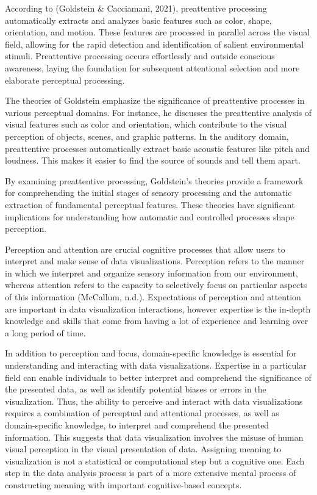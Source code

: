 \documentclass[print]{nuthesis}
\begin{document}
According to (Goldstein \& Cacciamani, 2021), preattentive processing automatically extracts and analyzes basic features such as color, shape, orientation, and motion.
These features are processed in parallel across the visual field, allowing for the rapid detection and identification of salient environmental stimuli.
Preattentive processing occurs effortlessly and outside conscious awareness, laying the foundation for subsequent attentional selection and more elaborate perceptual processing.

The theories of Goldstein emphasize the significance of preattentive processes in various perceptual domains.
For instance, he discusses the preattentive analysis of visual features such as color and orientation, which contribute to the visual perception of objects, scenes, and graphic patterns.
In the auditory domain, preattentive processes automatically extract basic acoustic features like pitch and loudness.
This makes it easier to find the source of sounds and tell them apart.

By examining preattentive processing, Goldstein's theories provide a framework for comprehending the initial stages of sensory processing and the automatic extraction of fundamental perceptual features.
These theories have significant implications for understanding how automatic and controlled processes shape perception.~

Perception and attention are crucial cognitive processes that allow users to interpret and make sense of data visualizations.
Perception refers to the manner in which we interpret and organize sensory information from our environment, whereas attention refers to the capacity to selectively focus on particular aspects of this information (McCallum, n.d.).
Expectations of perception and attention are important in data visualization interactions, however expertise is the in-depth knowledge and skills that come from having a lot of experience and learning over a long period of time.

In addition to perception and focus, domain-specific knowledge is essential for understanding and interacting with data visualizations.
Expertise in a particular field can enable individuals to better interpret and comprehend the significance of the presented data, as well as identify potential biases or errors in the visualization.
Thus, the ability to perceive and interact with data visualizations requires a combination of perceptual and attentional processes, as well as domain-specific knowledge, to interpret and comprehend the presented information.
This suggests that data visualization involves the misuse of human visual perception in the visual presentation of data.
Assigning meaning to visualization is not a statistical or computational step but a cognitive one.
Each step in the data analysis process is part of a more extensive mental process of constructing meaning with important cognitive-based concepts.
\end{document}
